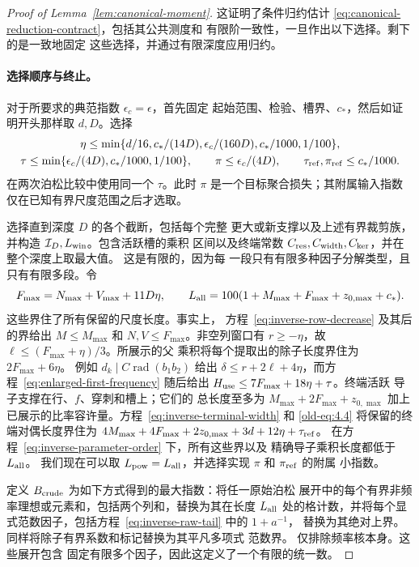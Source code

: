 \documentclass[11pt,a4paper]{article}
\numberwithin{equation}{section}
\numberwithin{figure}{section}
\theoremstyle{definition}
\theoremstyle{remark}
\begin{document}
\begin{proof}[Proof of Lemma~\ref{lem:canonical-moment}]
这证明了条件归约估计
\eqref{eq:canonical-reduction-contract}，包括其公共测度和
有限阶一致性，一旦作出以下选择。剩下的是一致地固定
这些选择，并通过有限深度应用归约。\paragraph{选择顺序与终止。}
对于所要求的典范指数 \(\epsilon_c=\epsilon\)，首先固定
起始范围、检验、槽界、\(c_*\)，然后如证明开头那样取 \(d,D\)。选择
\begin{equation}\label{eq:inverse-parameter-order}
 \begin{gathered}
 \eta\le\min\{d/16,c_*/(14D),\epsilon_c/(160D),c_*/1000,1/100\},\\
 \tau\le\min\{\epsilon_c/(4D),c_*/1000,1/100\},\qquad
 \pi\le\epsilon_c/(4D),\qquad
 \tau_{\rm ref},\pi_{\rm ref}\le c_*/1000.
 \end{gathered}
\end{equation}
在两次泊松比较中使用同一个 \(\tau\)。此时 \(\pi\)
是一个目标聚合损失；其附属输入指数仅在已知有界尺度范围之后才选取。

选择直到深度 \(D\) 的各个截断，包括每个完整
更大或新支撑以及上述有界裁剪族，并构造 \(\mathcal I_D,L_{\rm win}\)。包含活跃槽的乘积
区间以及终端常数
\(C_{\rm res},C_{\rm width},C_{\rm ker}\)，并在整个深度上取最大值。
这是有限的，因为每
一段只有有限多种因子分解类型，且只有有限多段。令
\[
 F_{\max}=N_{\max}+V_{\max}+11D\eta,\qquad
 L_{\rm all}=100(1+M_{\max}+F_{\max}+z_{0,\max}+c_*).
\]
这些界住了所有保留的尺度长度。事实上，
方程~\eqref{eq:inverse-row-decrease} 及其后的界给出
\(M\le M_{\max}\) 和 \(N,V\le F_{\max}\)。非空列窗口有
\(r\ge-\eta\)，故 \(\ell\le(F_{\max}+\eta)/3\)。所展示的父
乘积将每个提取出的除子长度界住为 \(2F_{\max}+6\eta\)。
例如 \(d_k\mid C\operatorname{rad}(b_1b_2)\) 给出
\(\delta\le r+2\ell+4\eta\)，而方程~\eqref{eq:enlarged-first-frequency}
随后给出 \(H_{\rm use}\le7F_{\max}+18\eta+\tau\)。终端活跃
导子支撑在行、\(f\)、穿刺和槽上；它们的
总长度至多为 \(M_{\max}+2F_{\max}+z_{0,\max}\) 加上
已展示的比率容许量。方程~\eqref{eq:inverse-terminal-width}
和 \eqref{old-eq:4.4} 将保留的终端对偶长度界住为
\(4M_{\max}+4F_{\max}+2z_{0,\max}+3d+12\eta+\tau_{\rm ref}\)。
在方程~\eqref{eq:inverse-parameter-order} 下，所有这些界以及
精确导子乘积长度都低于 \(L_{\rm all}\)。
我们现在可以取 \(L_{\rm pow}=L_{\rm all}\)，并选择实现 \(\pi\) 和 \(\pi_{\rm ref}\) 的附属
小指数。

定义 \(B_{\rm crude}\) 为如下方式得到的最大指数：将任一原始泊松
展开中的每个有界非频率理想或元素和，包括两个列和，替换为其在长度
\(L_{\rm all}\) 处的格计数，并将每个显式范数因子，包括方程~\eqref{eq:inverse-raw-tail} 中的 \(1+a^{-1}\)，
替换为其绝对上界。
同样将除子有界系数和标记替换为其平凡多项式
范数界。
仅排除频率核本身。这些展开包含
固定有限多个因子，因此这定义了一个有限的统一数。


\end{proof}
\end{document}
